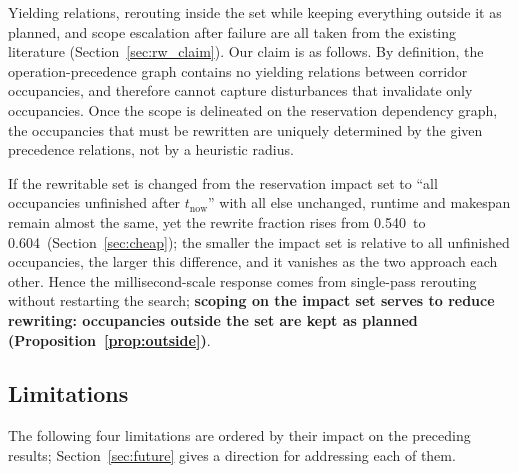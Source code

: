 \documentclass[manuscript,screen,review]{acmart}
\newcommand{\ResFracCheapRtwo}{0.540}
\newcommand{\ResFracAllFuture}{0.604}
\begin{document}
Yielding relations, rerouting inside the set while keeping everything outside it as planned, and scope escalation after failure are all taken from the existing literature
(Section~\ref{sec:rw_claim}). Our claim is as follows.
By definition, the operation-precedence graph contains no yielding relations between corridor occupancies, and therefore cannot capture disturbances that invalidate only occupancies.
Once the scope is delineated on the reservation dependency graph, the occupancies that must be rewritten are uniquely determined by the given precedence relations, not by a heuristic radius.

If the rewritable set is changed from the reservation impact set to ``all occupancies unfinished after \(t_{\mathrm{now}}\)''
with all else unchanged, runtime and makespan remain almost the same, yet the rewrite fraction rises from \ResFracCheapRtwo\ to
\ResFracAllFuture\ (Section~\ref{sec:cheap}); the smaller the impact set is relative to all unfinished occupancies, the larger this difference, and it vanishes as the two approach each other.
Hence the millisecond-scale response comes from single-pass rerouting without restarting the search; \textbf{scoping on the impact set serves to reduce rewriting: occupancies outside the set are kept as planned (Proposition~\ref{prop:outside})}.

\subsection{Limitations}
\label{sec:limitations}

The following four limitations are ordered by their impact on the preceding results; Section~\ref{sec:future} gives a direction for addressing each of them.
\end{document}
